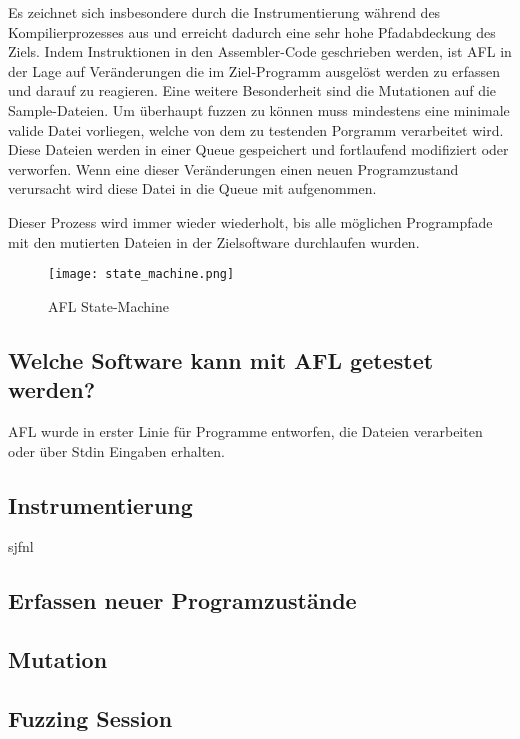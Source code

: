 \documentclass[12pt,a4paper]{scrreprt}
\begin{document}
Es zeichnet sich insbesondere durch die Instrumentierung während des Kompilierprozesses aus und erreicht dadurch eine sehr hohe Pfadabdeckung des Ziels. Indem Instruktionen in den Assembler-Code geschrieben werden, ist AFL in der Lage auf Veränderungen die im Ziel-Programm ausgelöst werden zu erfassen und darauf zu reagieren.
Eine weitere Besonderheit sind die Mutationen auf die Sample-Dateien. Um überhaupt fuzzen zu können muss mindestens eine minimale valide Datei vorliegen, welche von dem zu testenden Porgramm verarbeitet wird. Diese Dateien werden in einer Queue gespeichert und fortlaufend modifiziert oder verworfen. Wenn eine dieser Veränderungen einen neuen Programzustand verursacht wird diese Datei in die Queue mit aufgenommen.

Dieser Prozess wird immer wieder wiederholt, bis alle möglichen Programpfade mit den mutierten Dateien in der Zielsoftware durchlaufen wurden.



\begin{figure}[htbp] 
  \centering
     \texttt{[image: state\_machine.png]}
  \caption{AFL State-Machine}
  \label{fig:Bild0}
\end{figure}




\subsection{Welche Software kann mit AFL getestet werden?}
AFL wurde in erster Linie für Programme entworfen, die Dateien verarbeiten oder über Stdin Eingaben erhalten. 

\newpage
\subsection{Instrumentierung}	
sjfnl

\subsection{Erfassen neuer Programzustände}

\subsection{Mutation}

\subsection{Fuzzing Session}
\end{document}

